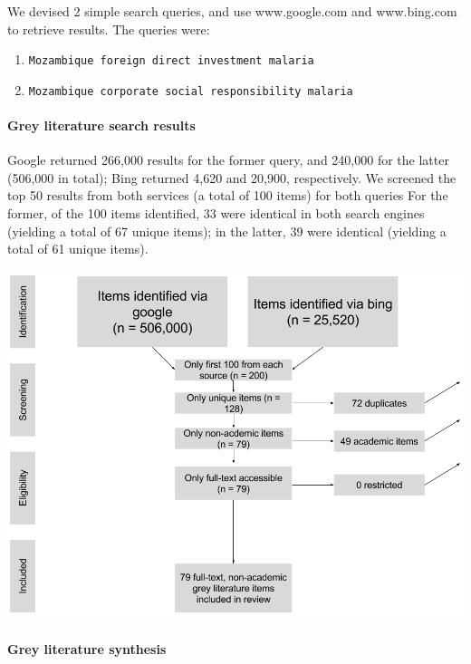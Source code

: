 \documentclass[]{article}
\providecommand{\tightlist}{%
  \setlength{\itemsep}{0pt}\setlength{\parskip}{0pt}}
\let\oldparagraph\paragraph
\renewcommand{\paragraph}[1]{\oldparagraph{#1}\mbox{}}
\begin{document}
We devised 2 simple search queries, and use www.google.com and
www.bing.com to retrieve results. The queries were:

\begin{enumerate}
\def\labelenumi{\arabic{enumi}.}
\tightlist
\item
  \texttt{Mozambique\ foreign\ direct\ investment\ malaria}
\item
  \texttt{Mozambique\ corporate\ social\ responsibility\ malaria}
\end{enumerate}

\paragraph{Grey literature search
results}\label{grey-literature-search-results}

Google returned 266,000 results for the former query, and 240,000 for
the latter (506,000 in total); Bing returned 4,620 and 20,900,
respectively. We screened the top 50 results from both services (a total
of 100 items) for both queries For the former, of the 100 items
identified, 33 were identical in both search engines (yielding a total
of 67 unique items); in the latter, 39 were identical (yielding a total
of 61 unique items).

\begin{center}
\includegraphics[width=400pt]{img/prisma_grey.png}
\end{center}

\paragraph{Grey literature synthesis}\label{grey-literature-synthesis}
\end{document}
